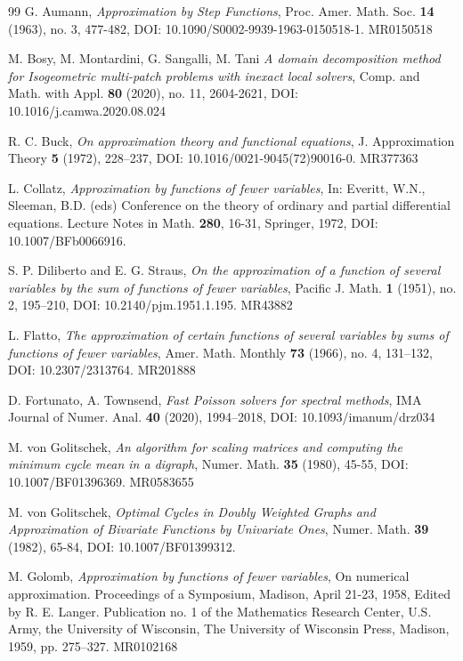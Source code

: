 \documentclass[12p]{article}
\numberwithin{equation}{section}
\begin{document}
\begin{thebibliography}{99}
G. Aumann, {\it Approximation by Step Functions}, Proc. Amer. Math. Soc. {\bf 14} (1963), no. 3, 477-482, DOI: 10.1090/S0002-9939-1963-0150518-1. MR0150518

M. Bosy, M. Montardini, G. Sangalli, M. Tani {\it A domain decomposition method for Isogeometric multi-patch problems with inexact local solvers}, Comp. and Math. with Appl. {\bf 80} (2020), no. 11, 2604-2621, DOI: 10.1016/j.camwa.2020.08.024

R. C. Buck, {\it On approximation theory and functional equations}, J. Approximation Theory {\bf 5} (1972), 228–237, DOI: 10.1016/0021-9045(72)90016-0. MR377363

L. Collatz, {\it Approximation by functions of fewer variables}, In: Everitt, W.N., Sleeman, B.D. (eds) Conference on the theory of ordinary and partial differential equations. Lecture Notes in Math. {\bf 280}, 16-31, Springer, 1972, DOI: 10.1007/BFb0066916.

S. P. Diliberto and E. G. Straus, {\it On the approximation of a function of several variables by the sum of functions of fewer variables}, Pacific J. Math. {\bf 1} (1951), no. 2, 195–210, DOI: 10.2140/pjm.1951.1.195. MR43882

L. Flatto, {\it The approximation of certain functions of several variables by sums of functions of fewer variables}, Amer. Math. Monthly {\bf 73} (1966), no. 4, 131–132, DOI: 10.2307/2313764. MR201888

D. Fortunato, A. Townsend, {\it Fast Poisson solvers for spectral methods}, IMA Journal of Numer. Anal. {\bf 40} (2020), 1994–2018, DOI: 10.1093/imanum/drz034

M. von Golitschek, {\it An algorithm for scaling matrices and computing the minimum cycle mean in a digraph}, Numer. Math. {\bf 35} (1980), 45-55, DOI: 10.1007/BF01396369. MR0583655

M. von Golitschek, {\it Optimal Cycles in Doubly Weighted Graphs and Approximation of Bivariate Functions by Univariate Ones}, Numer. Math. {\bf 39} (1982), 65-84, DOI: 10.1007/BF01399312.

M. Golomb, {\it Approximation by functions of fewer variables}, On numerical approximation. Proceedings of a Symposium, Madison, April 21-23, 1958, Edited by R. E. Langer. Publication no. 1 of the Mathematics Research Center, U.S. Army, the University of Wisconsin, The University of Wisconsin Press, Madison, 1959, pp. 275–327. MR0102168


\end{thebibliography}
\end{document}
